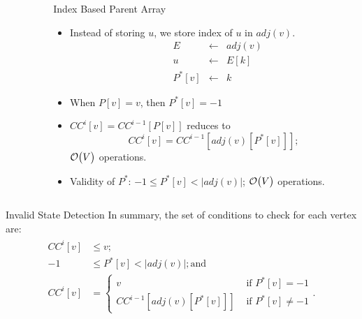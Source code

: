 \begin{columns}
\begin{column}{0.5\textwidth}
{}
\end{column}
\begin{column}{0.5\textwidth}
\begin{block}{Index Based Parent Array}
\begin{itemize}
\item<1-> Instead of storing $u$, we store index of $u$ in $adj(v)$.
\begin{align*}
       &E & \leftarrow & adj(v) \\
		&u   & \leftarrow & E[k]\\
	&P^{*}[v]   & \leftarrow & k  
\end{align*}
\item<5-> When $P[v]=v$, then  $P^{*}[v]=-1$
\item<6-> $CC^{i}[v] = CC^{i-1}[P[v]]$ reduces to 
\[
	CC^{i}[v] = CC^{i-1}[ adj(v)[P^{*}[v]]];
\]
{\color{dpg} $\operatorname{\mathcal{O}}\bigl({V}\bigr)$ operations. }%

\item<7-> Validity of $P^{*}$:  $-1 \leq P^{*}[v] < |adj(v)| $; 
{\color{dpg}  $\operatorname{\mathcal{O}}\bigl({V}\bigr)$ operations.}
\end{itemize}
\end{block}
\end{column}
\end{columns}
\lyxframeend{}

\begin{exampleblock}{Invalid State Detection}
In summary, the set of conditions to check for each vertex are:
\begin{align*}
\begin{split}
CC^{i}[v] 		&\leq v;  \\
 -1 			&\leq P^{*}[v] < |adj(v)|; \text{and} \\
CC^{i}[v]		&= \begin{cases}
v & \text{ if } P^{*}[v] = -1  \\
CC^{i-1}[ adj(v)[P^{*}[v]]] & \text{ if } P^{*}[v]\ne -1
\end{cases}.
\end{split} 
\end{align*}
\end{exampleblock}

